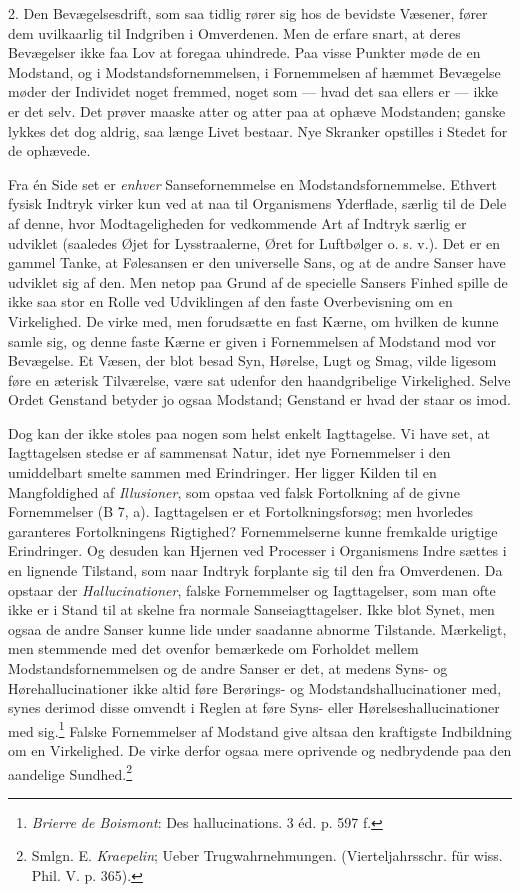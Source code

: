 \documentclass[12pt,a4paper,openany]{book}
\newcommand{\opage}[1]{\marginnote{\footnotesize\textit{[#1]}}}
\begin{document}
2. Den Bevægelsesdrift, som saa tidlig rører sig hos de bevidste
Væsener, fører dem uvilkaarlig til Indgriben i Omverdenen. Men de erfare
snart, at deres Bevægelser ikke faa Lov at foregaa uhindrede. Paa visse
Punkter møde de en Modstand, og i Modstandsfornemmelsen, i Fornemmelsen
af hæmmet Bevægelse møder der Individet noget fremmed, noget som ---
hvad det saa ellers er --- ikke er det selv. Det prøver maaske atter og
atter paa at ophæve Modstanden; ganske lykkes det dog aldrig, saa længe
Livet bestaar. Nye Skranker opstilles i Stedet for de ophævede.

Fra én Side set er \emph{enhver} Sansefornemmelse en
Modstandsfornemmelse. Ethvert fysisk Indtryk virker kun ved at naa til
Organismens Yderflade, særlig til de Dele af denne, hvor Modtageligheden
for vedkommende Art af Indtryk særlig er udviklet (saaledes Øjet for
Lysstraalerne, Øret for Luftbølger o. s. v.). Det er en gammel Tanke, at
Følesansen er den universelle Sans, og at de andre Sanser have udviklet
sig af den. Men netop paa Grund af de specielle Sansers Finhed spille de
ikke saa stor en Rolle ved Udviklingen af den faste Overbevisning om en
Virkelighed. De virke med, men forudsætte en fast Kærne, om hvilken de
kunne samle sig, og denne faste Kærne er given i Fornemmelsen af
Modstand mod vor Bevægelse. Et Væsen, der blot besad Syn, Hørelse, Lugt
og Smag, vilde ligesom føre en æterisk Tilværelse, være sat udenfor den
haandgribelige Virkelighed. Selve Ordet Genstand betyder jo ogsaa
Modstand; Genstand er hvad der staar os imod.

Dog kan der ikke stoles paa nogen som helst enkelt Iagttagelse. Vi have
set, at Iagttagelsen stedse er af sammensat Natur, idet nye Fornemmelser
i den umiddelbart smelte sammen med Erindringer. Her ligger Kilden til
en Mangfoldighed af \emph{Illusioner}, som opstaa ved falsk Fortolkning
af de givne Fornemmelser (B 7, a). Iagttagelsen er et
Fortolkningsforsøg; men hvorledes garanteres Fortolkningens Rigtighed?
Fornemmelserne kunne fremkalde urigtige Erindringer. Og desuden kan
Hjernen ved Processer i Organismens Indre sættes i en
\opage{253}lignende Tilstand, som naar Indtryk forplante sig til den fra
Omverdenen. Da opstaar der \emph{Hallucinationer}, falske Fornemmelser
og Iagttagelser, som man ofte ikke er i Stand til at skelne fra normale
Sanseiagttagelser. Ikke blot Synet, men ogsaa de andre Sanser kunne lide
under saadanne abnorme Tilstande. Mærkeligt, men stemmende med det
ovenfor bemærkede om Forholdet mellem Modstandsfornemmelsen og de andre
Sanser er det, at medens Syns- og Hørehallucinationer ikke altid føre
Berørings- og Modstandshallucinationer med, synes derimod disse omvendt
i Reglen at føre Syns- eller Hørelseshallucinationer med
sig.\footnote[1]{\emph{Brierre de Boismont}: Des hallucinations. 3 éd.
p. 597 f.} Falske Fornemmelser af Modstand give altsaa den kraftigste
Indbildning om en Virkelighed. De virke derfor ogsaa mere oprivende og
nedbrydende paa den aandelige Sundhed.\footnote[2]{Smlgn. E.
\emph{Kraepelin}; Ueber Trugwahrnehmungen. (Vierteljahrsschr. für wiss.
Phil. V. p. 365).}
\end{document}
